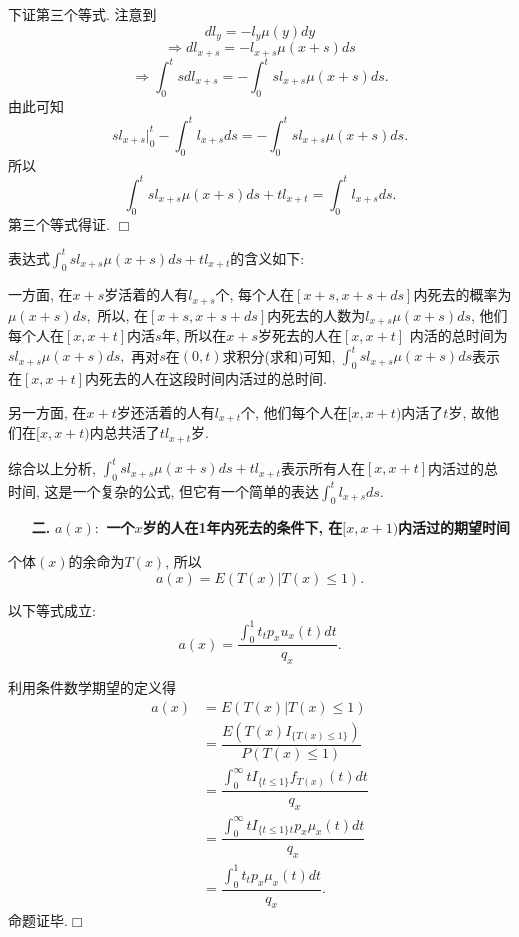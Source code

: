\documentclass[a4paper,openany, 10pt]{ctexbook}
\newcommand{\hei}{\CJKfamily{hei}}      %
\def\qed{\hfill$\Box$\medskip}
\begin{document}
下证第三个等式. 注意到
$$dl_y=-l_y\mu(y)dy$$
$$\Rightarrow dl_{x+s}=-l_{x+s}\mu(x+s)ds$$
$$\Rightarrow\int_0^tsdl_{x+s}=-\int_0^tsl_{x+s}\mu(x+s)ds.$$
由此可知$$sl_{x+s}\vert^{t}_{0}-\int_0^tl_{x+s}ds=-\int_0^tsl_{x+s}\mu(x+s)ds.$$
所以
$$\int_0^tsl_{x+s}\mu(x+s)ds+tl_{x+t}=\int_0^tl_{x+s}ds.$$
第三个等式得证.
\qed
\begin{remark}
  表达式$\int_0^tsl_{x+s}\mu(x+s)ds+tl_{x+t}$的含义如下:

\noindent 一方面, 在$x+s$岁活着的人有$l_{x+s}$个, 每个人在$[x+s,x+s+ds]$内死去的概率为$\mu(x+s)ds,$ 所以, 在$[x+s,x+s+ds]$内死去的人数为$l_{x+s}\mu(x+s)ds$, 他们每个人在$[x,x+t]$内活$s$年, 所以在$x+s$岁死去的人在$[x,x+t]$ 内活的总时间为$sl_{x+s}\mu(x+s)ds,$ 再对$s$在$(0,t)$求积分(求和)可知, $\int_0^tsl_{x+s}\mu(x+s)ds$表示在$[x,x+t]$内死去的人在这段时间内活过的总时间.

另一方面, 在$x+t$岁还活着的人有$l_{x+t}$个, 他们每个人在$[x,x+t)$内活了$t$岁, 故他们在$[x,x+t)$内总共活了$tl_{x+t}$岁.

综合以上分析, $\int_0^tsl_{x+s}\mu(x+s)ds+tl_{x+t}$表示所有人在$[x,x+t]$内活过的总时间, 这是一个复杂的公式, 但它有一个简单的表达$\int_0^tl_{x+s}ds.$
\end{remark}


\begin{itemize}
    \item[{\bf\hei 二.}]{\bf\hei $a(x):$ 一个$x$岁的人在1年内死去的条件下, 在$[x,x+1)$内活过的期望时间}
\end{itemize}

个体$(x)$的余命为$T(x)$, 所以$$a(x)=E(T(x)|T(x)\le1).$$
\begin{proposition}以下等式成立:
    $$a(x)=\dfrac {\int_0^1t{}_tp_xu_x(t)dt}{q_x}.$$
\end{proposition}
\proof 利用条件数学期望的定义得
\begin{align*}
    a(x) & =E(T(x)|T(x)\le1)                                                \\
         & =\dfrac {E(T(x)I_{\{T(x)\le1\}})}{P(T(x)\le1)}                   \\
         & =\dfrac {\int_0^{\infty}tI_{\{t\le1\}}f_{T(x)}(t)dt}{q_x}     \\
         & =\dfrac {\int_0^{\infty}tI_{\{t\le1\}}{}_tp_x\mu_x(t)dt}{q_x} \\
         & =\dfrac {\int_0^1t{}_tp_x\mu_x(t)dt}{q_x}.
\end{align*}
命题证毕.\qed
\end{document}

